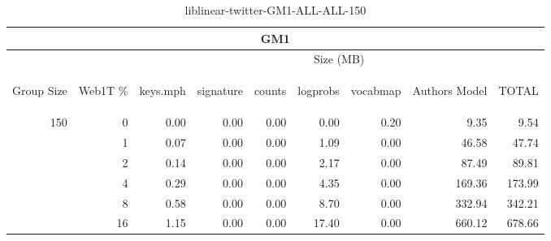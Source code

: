 \begin{center}
\begin{table}[htbp] 
 \begin{center}
\begin{tabular}{ | r | r | r | r | r | r | r | r | r |}
\hline
\multicolumn{9}{|c|}{GM1}\\
\hline
 & & \multicolumn{7}{|c|}{Size (MB)}\\ \cline{3-9}
\begin{sideways}Group Size\end{sideways} & \begin{sideways}Web1T \% \end{sideways} & \begin{sideways}keys.mph\end{sideways} & \begin{sideways}signature\end{sideways} & \begin{sideways}counts\end{sideways} & \begin{sideways}logprobs\end{sideways} & \begin{sideways}vocabmap\end{sideways} & \begin{sideways}Authors Model \end{sideways} & \begin{sideways}TOTAL\end{sideways}\\
\hline
\multirow{5}{*}{150}
 & 0 & 0.00 & 0.00 & 0.00 & 0.00 & 0.20 & 9.35 & 9.54\\ \cline{2-9}
 & 1 & 0.07 & 0.00 & 0.00 & 1.09 & 0.00 & 46.58 & 47.74\\ \cline{2-9}
 & 2 & 0.14 & 0.00 & 0.00 & 2.17 & 0.00 & 87.49 & 89.81\\ \cline{2-9}
 & 4 & 0.29 & 0.00 & 0.00 & 4.35 & 0.00 & 169.36 & 173.99\\ \cline{2-9}
 & 8 & 0.58 & 0.00 & 0.00 & 8.70 & 0.00 & 332.94 & 342.21\\ \cline{2-9}
 & 16 & 1.15 & 0.00 & 0.00 & 17.40 & 0.00 & 660.12 & 678.66\\ \cline{2-9}
\hline
\end{tabular}
\caption{liblinear-twitter-GM1-ALL-ALL-150}
\label{table:liblinear-twitter-GM1-ALL-ALL-150}
\end{center}
 \end{table}
\end{center}

